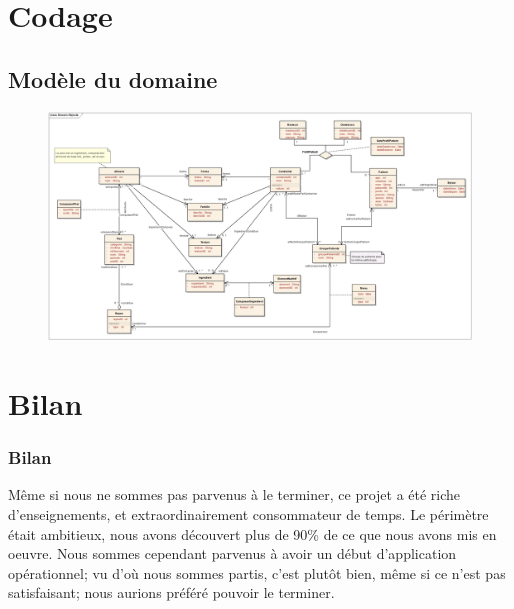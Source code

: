 \documentclass{beamer}
\begin{document}
\section{Codage}
\subsection{Modèle du domaine}
\begin{frame}[plain]{}
\begin{figure}
\centering
\includegraphics[scale=0.250]{../ModeleDuDomaine/ModeleDuDomaine.png}
\end{figure}
\end{frame}

\section{Bilan}
\begin{frame}[label=Bilan]
  \frametitle{Bilan}
  Même si nous ne sommes pas parvenus à le terminer, ce projet a été riche d'enseignements, et extraordinairement consommateur de temps.
Le périmètre était ambitieux, nous avons découvert plus de 90\% de ce que nous avons mis en oeuvre. Nous sommes cependant parvenus à avoir un début d'application opérationnel; vu d'où nous sommes partis, c'est plutôt bien, même si ce n'est pas satisfaisant; nous aurions préféré pouvoir le terminer.

\end{frame}
\end{document}
